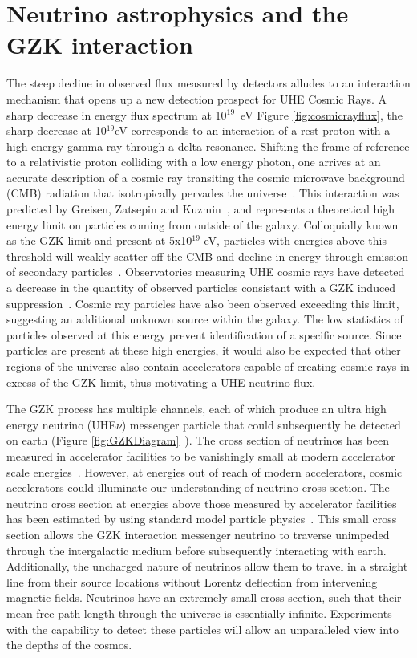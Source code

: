 \section{Neutrino astrophysics and the GZK interaction}
		The steep decline in observed flux measured by detectors alludes to an interaction mechanism that opens up a new detection prospect for UHE Cosmic Rays.  A sharp decrease in energy flux spectrum at 10$^{19}$~eV Figure \ref{fig:cosmicrayflux}, the sharp decrease at 10$^{19}$eV corresponds to an interaction of a rest proton with a high energy gamma ray through a delta resonance.  Shifting the frame of reference to a relativistic proton colliding with a low energy photon, one arrives at an accurate description of a cosmic ray transiting the cosmic microwave background (CMB) radiation that isotropically pervades the universe~\cite{WMAPCMBResults}.  This interaction was predicted by Greisen, Zatsepin and Kuzmin~\cite{GZK}, and represents a theoretical high energy limit on particles coming from outside of the galaxy.  Colloquially known as the GZK limit and present at 5x10$^{19}$ eV, particles with energies above this threshold will weakly scatter off the CMB and decline in energy through emission of secondary particles~\cite{GZK}.  Observatories measuring UHE cosmic rays have detected a decrease in the quantity of observed particles consistant with a GZK induced suppression~\cite{GZKMeasurement}. Cosmic ray particles have also been observed exceeding this limit, suggesting an additional unknown source within the galaxy.  The low statistics of particles observed at this energy prevent identification of a specific source.  Since particles are present at these high energies, it would also be expected that other regions of the universe also contain accelerators capable of creating cosmic rays in excess of the GZK limit, thus motivating a UHE neutrino flux.
		
		The GZK process has multiple channels, each of which produce an ultra high energy neutrino (UHE$\nu$) messenger particle that could subsequently be detected on earth (Figure \ref{fig:GZKDiagram}~\cite{GZK}). The cross section of neutrinos has been measured in accelerator facilities to be vanishingly small at modern accelerator scale energies~\cite{neutrinoCrossSectionMeasurements}.  However, at energies out of reach of modern accelerators, cosmic accelerators could illuminate our understanding of neutrino cross section.  The neutrino cross section at energies above those measured by accelerator facilities has been estimated by using standard model particle physics~\cite{neutrinoCrossSectionExtrapolation}. This small cross section allows the GZK interaction messenger neutrino to traverse unimpeded through the intergalactic medium before subsequently interacting with earth.  Additionally, the uncharged nature of neutrinos allow them to travel in a straight line from their source locations without Lorentz deflection from intervening magnetic fields.  Neutrinos have an extremely small cross section, such that their mean free path length through the universe is essentially infinite. Experiments with the capability to detect these particles will allow an unparalleled view into the depths of the cosmos.

